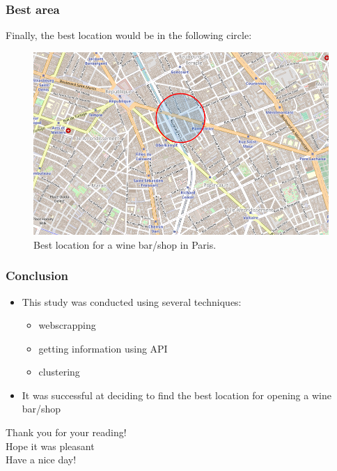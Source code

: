 \documentclass{beamer}
\begin{document}
\begin{frame}
	\frametitle{Best area}
	Finally, the best location would be in the following circle:
	\begin{figure}[h]
		\centering
		\includegraphics[width=0.8\linewidth,keepaspectratio]{Figures/FoliumFinal}
		\caption{Best location for a wine bar/shop in Paris.}
		\label{FinalLocation}
	\end{figure}
\end{frame}

\begin{frame}
	\frametitle{Conclusion}
	\begin{itemize}
		\item This study was conducted using several techniques:
		\begin{itemize}
			\item webscrapping
			\item getting information using API
			\item clustering
		\end{itemize}
	\item It was successful at deciding to find the best location for opening a wine bar/shop
	\end{itemize}
\end{frame}


\begin{frame}
	\begin{center}
		\Huge{Thank you for your reading! \\ Hope it was pleasant \\ Have a nice day!}
	\end{center}
\end{frame}
\end{document}
